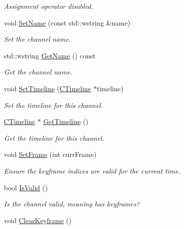 \begin{DoxyCompactItemize}
\begin{DoxyCompactList}\small\item\em Assignment operator disabled. \end{DoxyCompactList}\item 
void \hyperlink{class_c_anim_channel_acd94fef3b6bb9279aac24fd912198d47}{Set\+Name} (const std\+::wstring \&name)
\begin{DoxyCompactList}\small\item\em Set the channel name. \end{DoxyCompactList}\item 
std\+::wstring \hyperlink{class_c_anim_channel_a5719b94bb069345636f3b6274522bd0c}{Get\+Name} () const 
\begin{DoxyCompactList}\small\item\em Get the channel name. \end{DoxyCompactList}\item 
void \hyperlink{class_c_anim_channel_a73cb35e7bd3840e918a1762650541cab}{Set\+Timeline} (\hyperlink{class_c_timeline}{C\+Timeline} $\ast$timeline)
\begin{DoxyCompactList}\small\item\em Set the timeline for this channel. \end{DoxyCompactList}\item 
\hyperlink{class_c_timeline}{C\+Timeline} $\ast$ \hyperlink{class_c_anim_channel_a668a7b1770bb3f2605e937b905bcfde7}{Get\+Timeline} ()
\begin{DoxyCompactList}\small\item\em Get the timeline for this channel. \end{DoxyCompactList}\item 
void \hyperlink{class_c_anim_channel_a1f68764b84b12c943570cfd2e08d7015}{Set\+Frame} (int curr\+Frame)
\begin{DoxyCompactList}\small\item\em Ensure the keyframe indices are valid for the current time. \end{DoxyCompactList}\item 
bool \hyperlink{class_c_anim_channel_ada18e6cdd72a834417b1067be1205a3f}{Is\+Valid} ()
\begin{DoxyCompactList}\small\item\em Is the channel valid, meaning has keyframes? \end{DoxyCompactList}\item 
\hypertarget{class_c_anim_channel_abccfa21587f36a2edb9365ce986a21e2}{void \hyperlink{class_c_anim_channel_abccfa21587f36a2edb9365ce986a21e2}{Clear\+Keyframe} ()}\label{class_c_anim_channel_abccfa21587f36a2edb9365ce986a21e2}


\end{DoxyCompactItemize}
